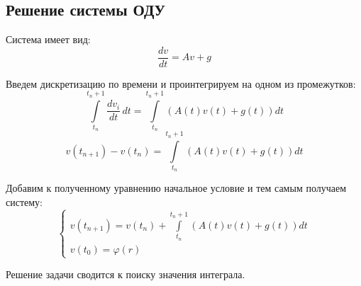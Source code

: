\subsection{Решение системы ОДУ}

Система имеет вид:
\[
  \frac{d v}{dt} = Av + g
\]

Введем дискретизацию по времени и проинтегрируем на одном из промежутков:
\[
  \int\limits_{t_{n}}^{t_n+1} \frac{d v_i}{dt} \,dt = \int\limits_{t_{n}}^{t_n+1} (A(t)v(t) + g(t)) dt
\]
\[
  v(t_{n+1}) - v(t_n) = \int\limits_{t_{n}}^{t_n+1} (A(t)v(t) + g(t)) dt
\]

Добавим к полученному уравнению начальное условие и тем самым получаем систему:
\[
  \begin{cases}
    v(t_{n+1}) = v(t_n) + \int\limits_{t_{n}}^{t_n+1} (A(t)v(t) + g(t)) dt \\
    v(t_0) = \varphi(r)
  \end{cases}
\]

Решение задачи сводится к поиску значения интеграла.
